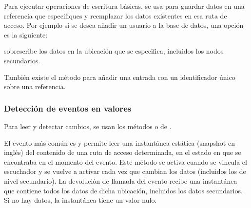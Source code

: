 Para ejecutar operaciones de escritura básicas, se usa  para guardar
datos en una referencia que especifiques y reemplazar los datos existentes en
esa ruta de acceso. Por ejemplo si se desea añadir un usuario a la base de datos,
una opción es la siguiente:

%
\begin{sphinxVerbatim}[commandchars=\\\{\}]
     
  
     
     
      
\end{sphinxVerbatim}

 sobrescribe los datos en la ubicación que se especifica, incluidos
los nodos secundarios.

También existe el método  para añadir una entrada con un identificador
único sobre una referencia.

\subsubsection*{Detección de eventos en valores}
\label{\detokenize{firebase_web:detecta-eventos-en-valores}}
Para leer y detectar cambios,
se usan los métodos  o  de .

El evento más común es  y permite leer una instantánea estática (snapshot en inglés) del
contenido de una ruta de acceso determinada, en el estado en que se encontraba
en el momento del evento. Este método se activa cuando se vincula el escuchador
y se vuelve a activar cada vez que cambian los datos (incluidos los de
nivel secundario). La devolución de llamada del evento recibe una instantánea
que contiene todos los datos de dicha ubicación, incluidos los datos
secundarios. Si no hay datos, la instantánea tiene un valor nulo.

